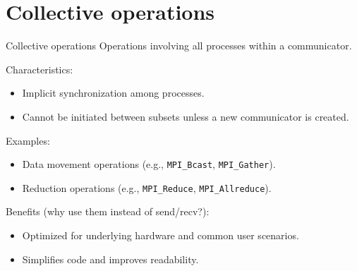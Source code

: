 \documentclass{beamer}
\begin{document}
\section{Collective operations}

\begin{frame}{Collective operations}
  Operations involving all processes within a communicator.

  Characteristics:
  \begin{itemize}
    \item Implicit synchronization among processes.
    \item Cannot be initiated between subsets unless a new communicator is created.
  \end{itemize}

  Examples:
  \begin{itemize}
    \item Data movement operations (e.g., \texttt{MPI\_Bcast}, \texttt{MPI\_Gather}).
    \item Reduction operations (e.g., \texttt{MPI\_Reduce}, \texttt{MPI\_Allreduce}).
  \end{itemize}

  Benefits (why use them instead of send/recv?):
  \begin{itemize}
    \item Optimized for underlying hardware and common user scenarios.
    \item Simplifies code and improves readability.
  \end{itemize}
\end{frame}
\end{document}
